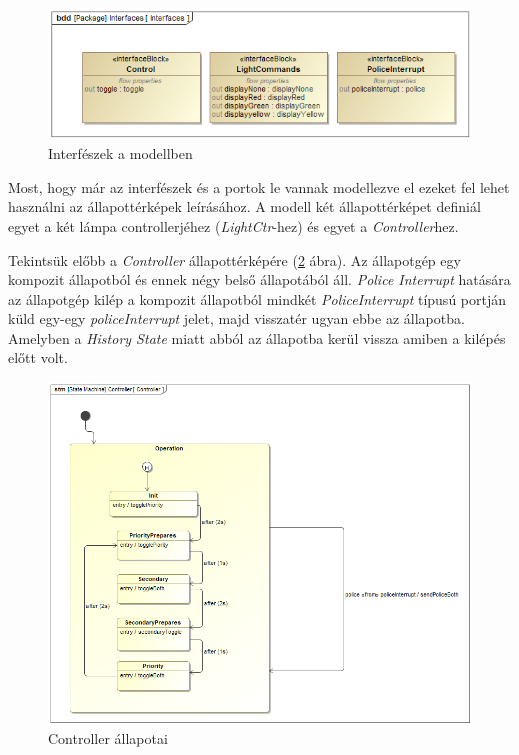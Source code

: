 \begin{figure}[!ht]
	\centering
	\includegraphics[width=15cm, keepaspectratio]{figures/contribution/Interfaces.png}
	\caption{Interfészek a modellben}
	\label{fig:Interfaces}
\end{figure}

Most, hogy már az interfészek és a portok le vannak modellezve el ezeket fel lehet használni az állapottérképek leírásához. A modell két állapottérképet definiál egyet a két lámpa controllerjéhez (\emph{LightCtr}-hez) és egyet a \emph{Controller}hez.

Tekintsük előbb a \emph{Controller} állapottérképére (\ref{fig:ControllerSM} ábra). Az állapotgép egy kompozit állapotból és ennek négy belső állapotából áll. \emph{Police Interrupt} hatására az állapotgép kilép a kompozit állapotból mindkét \emph{PoliceInterrupt} típusú portján küld egy-egy \emph{policeInterrupt} jelet, majd visszatér ugyan ebbe az állapotba. Amelyben a \emph{History State} miatt abból az állapotba kerül vissza amiben a kilépés előtt volt.

\begin{figure}[!ht]
	\centering
	\includegraphics[width=12cm, keepaspectratio]{figures/contribution/ControllerSM.png}
	\caption{Controller állapotai}
	\label{fig:ControllerSM}
\end{figure}

